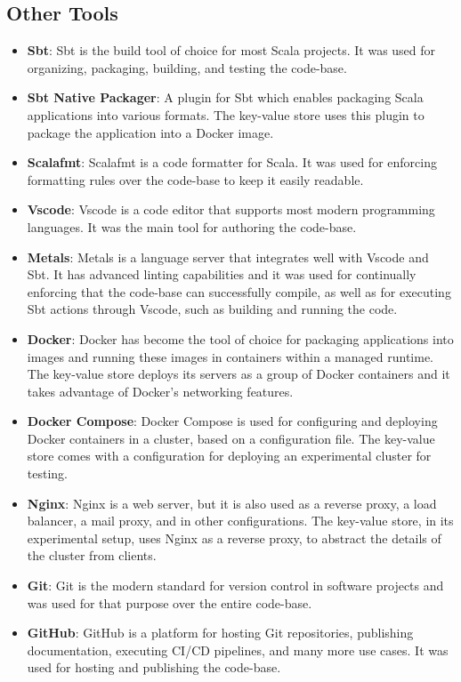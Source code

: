 \subsection{Other Tools}

\begin{itemize}
    \item \textbf{Sbt}: Sbt is the build tool of choice for most Scala projects. It was used for organizing, packaging, building, and testing the code-base.
    \item \textbf{Sbt Native Packager}: A plugin for Sbt which enables packaging Scala applications into various formats. The key-value store uses this plugin to package the application into a Docker image.
    \item \textbf{Scalafmt}: Scalafmt is a code formatter for Scala. It was used for enforcing formatting rules over the code-base to keep it easily readable.
    \item \textbf{Vscode}: Vscode is a code editor that supports most modern programming languages. It was the main tool for authoring the code-base.
    \item \textbf{Metals}: Metals is a language server that integrates well with Vscode and Sbt. It has advanced linting capabilities and it was used for continually enforcing that the code-base can successfully compile, as well as for executing Sbt actions through Vscode, such as building and running the code.
    \item \textbf{Docker}: Docker has become the tool of choice for packaging applications into images and running these images in containers within a managed runtime. The key-value store deploys its servers as a group of Docker containers and it takes advantage of Docker's networking features.
    \item \textbf{Docker Compose}: Docker Compose is used for configuring and deploying Docker containers in a cluster, based on a configuration file. The key-value store comes with a configuration for deploying an experimental cluster for testing.
    \item \textbf{Nginx}: Nginx is a web server, but it is also used as a reverse proxy, a load balancer, a mail proxy, and in other configurations. The key-value store, in its experimental setup, uses Nginx as a reverse proxy, to abstract the details of the cluster from clients.
    \item \textbf{Git}: Git is the modern standard for version control in software projects and was used for that purpose over the entire code-base. 
    \item \textbf{GitHub}: GitHub is a platform for hosting Git repositories, publishing documentation, executing CI/CD pipelines, and many more use cases. It was used for hosting and publishing the code-base.
\end{itemize}

